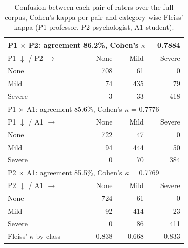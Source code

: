 \begin{table}[!t]
\centering
\small
\caption{Confusion between each pair of raters over the full corpus, Cohen's kappa per pair and category-wise Fleiss' kappa (P1 professor, P2 psychologist, A1 student).}
\label{tab:concordancia}
\begin{tabular}{lrrr}
\toprule
\multicolumn{4}{l}{P1 $\times$ P2: agreement 86.2\%, Cohen's $\kappa$ = 0.7884} \\
\midrule
P1 $\downarrow$ / P2 $\rightarrow$ & None & Mild & Severe \\
None & 708 & 61 & 0 \\
Mild & 74 & 435 & 79 \\
Severe & 3 & 33 & 418 \\
\midrule
\multicolumn{4}{l}{P1 $\times$ A1: agreement 85.6\%, Cohen's $\kappa$ = 0.7776} \\
\midrule
P1 $\downarrow$ / A1 $\rightarrow$ & None & Mild & Severe \\
None & 722 & 47 & 0 \\
Mild & 94 & 444 & 50 \\
Severe & 0 & 70 & 384 \\
\midrule
\multicolumn{4}{l}{P2 $\times$ A1: agreement 85.5\%, Cohen's $\kappa$ = 0.7769} \\
\midrule
P2 $\downarrow$ / A1 $\rightarrow$ & None & Mild & Severe \\
None & 724 & 61 & 0 \\
Mild & 92 & 414 & 23 \\
Severe & 0 & 86 & 411 \\
\midrule
Fleiss' $\kappa$ by class & 0.838 & 0.668 & 0.833 \\
\bottomrule
\end{tabular}
\end{table}

